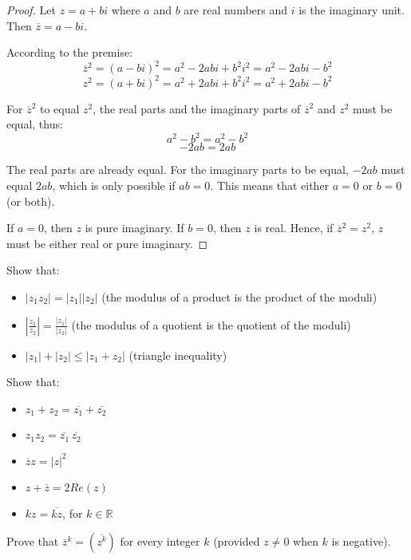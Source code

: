         \begin{proof}
        Let \( z = a + bi \) where \( a \) and \( b \) are real numbers and \( i \) is the imaginary unit. Then \( \overline{z} = a - bi \). 
        
        According to the premise:
        \[ \overline{z}^2 = (a - bi)^2 = a^2 - 2abi + b^2i^2 = a^2 - 2abi - b^2 \]
        \[ z^2 = (a + bi)^2 = a^2 + 2abi + b^2i^2 = a^2 + 2abi - b^2 \]
        
        For \( \overline{z}^2 \) to equal \( z^2 \), the real parts and the imaginary parts of \( \overline{z}^2 \) and \( z^2 \) must be equal, thus:
        \[ a^2 - b^2 = a^2 - b^2 \]
        \[ -2ab = 2ab \]
        
        The real parts are already equal. For the imaginary parts to be equal, \( -2ab \) must equal \( 2ab \), which is only possible if \( ab = 0 \). This means that either \( a = 0 \) or \( b = 0 \) (or both).
        
        If \( a = 0 \), then \( z \) is pure imaginary. If \( b = 0 \), then \( z \) is real. Hence, if \( \overline{z}^2 = z^2 \), \( z \) must be either real or pure imaginary.
        \end{proof}

        \begin{exercise}
            Show that:
            \begin{itemize}
                \item$\lvert z_1z_2 \rvert = \lvert z_1 \rvert \lvert z_2 \rvert$ \quad (the modulus of a product is the product of the moduli)
                \item $\left\lvert \frac{z_1}{z_2} \right\rvert = \frac{\lvert z_1 \rvert}{\lvert z_2 \rvert}$ \quad (the modulus of a quotient is the quotient of the moduli)
                \item $\lvert z_1 \rvert + \lvert z_2 \rvert \leq \lvert z_1 + z_2 \rvert$ \quad (triangle inequality)
              \end{itemize}
        \end{exercise}
        
        \begin{exercise}
            Show that:
            \begin{itemize}
                \item $z_1 + z_2 = \overline{z_1} + \overline{z_2}$
                \item $z_1z_2 = \overline{z_1} \, \overline{z_2}$
                \item $\overline{z}z = \lvert z \rvert^2$
                \item $z + \overline{z} = 2Re(z)$
                \item $kz = \overline{kz}$, for $k \in \mathbb{R}$
              \end{itemize}
        \end{exercise}
        \begin{exercise}
            Prove that \( \overline{z}^k = (\overline{z^k}) \) for every integer \( k \) (provided \( z \neq 0 \) when \( k \) is negative).
            \end{exercise}
            
